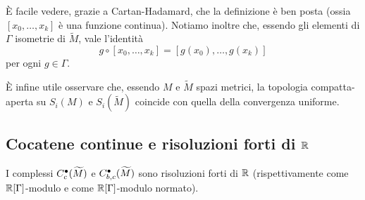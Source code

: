È facile vedere, grazie a Cartan-Hadamard, che la definizione è ben posta (ossia $[x_0,\ldots,x_k]$ è una funzione continua). Notiamo inoltre che, essendo gli elementi di $\Gamma$ isometrie di $\widetilde M$, vale l'identità
\[
g\circ[x_0,\ldots,x_k]=[g(x_0),\ldots,g(x_k)]
\]
per ogni $g\in\Gamma$.

È infine utile osservare che, essendo $M$ e $\widetilde M$ spazi metrici, la topologia compatta-aperta su $S_i(M)$ e $S_i(\widetilde M)$ coincide con quella della convergenza uniforme.

\subsection{Cocatene continue e risoluzioni forti di $\mathbb{R}$}

\begin{proposition}
I complessi $C^\bullet_c(\widetilde M)$ e $C^\bullet_{b,c}(\widetilde M)$ sono risoluzioni  forti di $\mathbb{R}$ (rispettivamente come $\mathbb{R}[\Gamma]$-modulo e come $\mathbb{R}[\Gamma]$-modulo normato).
\end{proposition}
